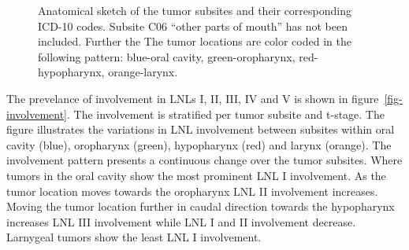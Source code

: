 \documentclass[
  sn-mathphys-num,
]{sn-jnl}
\begin{document}
\begin{figure}


\caption{\label{fig-subsites}Anatomical sketch of the tumor subsites and
their corresponding ICD-10 codes. Subsite C06 ``other parts of mouth''
has not been included. Further the The tumor locations are color coded
in the following pattern: blue-oral cavity, green-oropharynx,
red-hypopharynx, orange-larynx.}

\end{figure}%

The prevelance of involvement in LNLs I, II, III, IV and V is shown in
figure~\ref{fig-involvement}. The involvement is stratified per tumor
subsite and t-stage. The figure illustrates the variations in LNL
involvement between subsites within oral cavity (blue), oropharynx
(green), hypopharynx (red) and larynx (orange). The involvement pattern
presents a continuous change over the tumor subsites. Where tumors in
the oral cavity show the most prominent LNL I involvement. As the tumor
location moves towards the oropharynx LNL II involvement increases.
Moving the tumor location further in caudal direction towards the
hypopharynx increases LNL III involvement while LNL I and II involvement
decrease. Larnygeal tumors show the least LNL I involvement.
\end{document}
